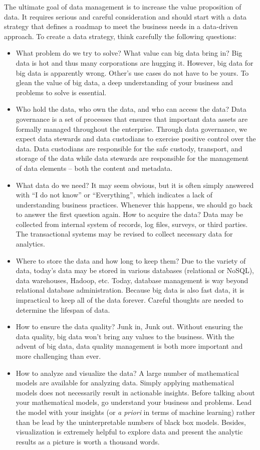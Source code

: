 \documentclass[11pt]{book}
\begin{document}
The ultimate goal of data management is to increase the value proposition of data. It requires serious and careful consideration and should start with a data strategy that defines a roadmap to meet the business needs in a data-driven approach. To create a data strategy, think carefully the following questions:
\begin{itemize}
\item What problem do we try to solve? What value can big data bring in? Big data is hot and thus many corporations are hugging it. However, big data for big data is apparently wrong. Other's use cases do not have to be yours. To glean the value of big data, a deep understanding of your business and problems to solve is essential.
\item Who hold the data, who own the data, and who can access the data? Data governance is a set of processes that ensures that important data assets are formally managed throughout the enterprise. Through data governance, we expect data stewards and data custodians to exercise positive control over the data. Data custodians are responsible for the safe custody, transport, and storage of the data while data stewards are responsible for the management of data elements -- both the content and metadata.
\item What data do we need? It may seem obvious, but it is often simply answered with ``I do not know'' or ``Everything'', which indicates a lack of understanding business practices. Whenever this happens, we should go back to answer the first question again. How to acquire the data? Data may be collected from internal system of records, log files, surveys, or third parties. The transactional systems may be revised to collect necessary data for analytics.
\item Where to store the data and how long to keep them? Due to the variety of data, today's data may be stored in various databases (relational or NoSQL), data warehouses, Hadoop, etc. Today, database management is way beyond relational database administration. Because big data is also fast data, it is impractical to keep all of the data forever. Careful thoughts are needed to determine the lifespan of data.
\item How to ensure the data quality? Junk in, Junk out. Without ensuring the data quality, big data won't bring any values to the business. With the advent of big data, data quality management is both more important and more challenging than ever. 
\item How to analyze and visualize the data? A large number of mathematical models are available for analyzing data. Simply applying mathematical models does not necessarily result in actionable insights. Before talking about your mathematical models, go understand your business and problems. Lead the model with your insights (or {\em a priori} in terms of machine learning) rather than be lead by the uninterpretable numbers of black box models. Besides, visualization is extremely helpful to explore data and present the analytic results as a picture is worth a thousand words.

\end{itemize}
\end{document}
